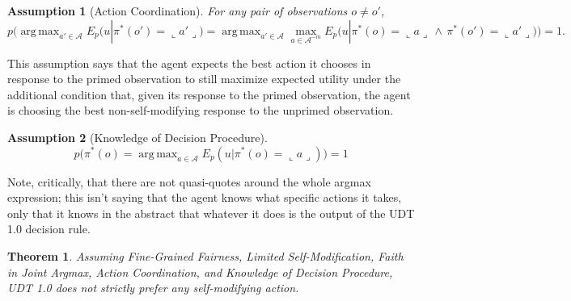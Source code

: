 \documentclass{article}
\newtheorem{assumption}{Assumption}
\newtheorem{theorem}{Theorem}
\DeclareMathOperator*{\argmax}{arg\,max}
\begin{document}
\begin{assumption}[Action Coordination]
For any pair of observations $o \neq o'$,
$$p \Big( \argmax_{a' \in \mathcal{A}} E_p \big( u | \pi^*(o') = \llcorner a' \lrcorner \big) = \argmax_{a' \in \mathcal{A}} \max_{a \in \mathcal{A}^{-m}} E_p \big( u | \pi^*(o) = \llcorner a \lrcorner \,\land\,\pi^*(o') = \llcorner a' \lrcorner \big) \Big) = 1.$$
\end{assumption} 

This assumption says that the agent expects the best action it chooses in response to the primed observation to still maximize expected utility under the additional condition that, given its response to the primed observation, the agent is choosing the best non-self-modifying response to the unprimed observation.

\begin{assumption}[Knowledge of Decision Procedure]
    $$p\big(\pi^*(o)= \argmax_{a \in \mathcal{A}} E_{p}(u|\pi^*(o)=\llcorner a \lrcorner) \big)=1$$
\end{assumption}

Note, critically, that there are not quasi-quotes around the whole argmax expression; this isn't saying that the agent knows what specific actions it takes, only that it knows in the abstract that whatever it does is the output of the UDT 1.0 decision rule.

\begin{theorem}\label{tiling}
Assuming Fine-Grained Fairness, Limited Self-Modification, Faith in Joint Argmax, Action Coordination, and Knowledge of Decision Procedure, UDT 1.0 does not strictly prefer any self-modifying action.
\end{theorem}
\end{document}
